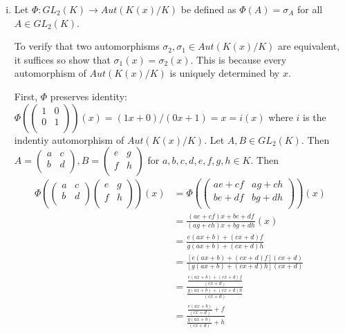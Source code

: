 \begin{solution}
\begin{enumerate}[(i)]
		\item Let $\Phi : GL_2(K) \longrightarrow Aut(K(x)/K) $ be defined as
		$\Phi (A) = \sigma_A $ for all $A \in GL_2(K)$. 
		\begin{remark}
			To verify that two automorphisms $\sigma_2,\sigma_1 \in Aut(K(x)/K)$ 
			are equivalent, it suffices so show that $\sigma_1(x)=\sigma_2(x)$. 
			This is because every automorphism of $Aut(K(x)/K)$ is uniquely 
			determined by $x$. 
		\end{remark}
			First, $\Phi$ preserves
			identity: $\Phi(\begin{pmatrix} 1 & 0 \\ 0 & 1 \\ \end{pmatrix})(x) = (1x + 0)/(0x +1) = x = i(x)$
			where $i$ is the indentiy automorphism of $Aut(K(x)/K)$. Let $A,B \in GL_2(K)$.
			Then $A = \begin{pmatrix} a & c \\ b & d \\ \end{pmatrix} , B = \begin{pmatrix} e & g \\ f & h \\ \end{pmatrix} $ 
			for $a,b,c,d,e,f,g,h \in K$. Then
			\begin{align*}
				\Phi (\begin{pmatrix} a & c \\ b & d \\ \end{pmatrix}
				\begin{pmatrix} e & g \\ f & h \\ \end{pmatrix})(x) &= 
				\Phi (\begin{pmatrix} ae + cf & ag + ch \\ be + df & bg + dh \\ \end{pmatrix})(x) \\
				&= \frac{(ae+cf)x + be+df}{(ag+ch)x+bg+dh} (x)\\
				&= \frac{e(ax+b) + (cx+d)f}{g(ax+b)+ (cx+d)h} \\
				&= \frac{[e(ax+b) + (cx+d)f](cx+d)}{[g(ax+b)+ (cx+d)h](cx+d)} \\
				&= \frac{\frac{e(ax+b) + (cx+d)f}{(cx+d)}}{\frac{g(ax+b) + (cx+d)h}{(cx+d)}} \\
				&= \frac{\frac{e(ax+b)}{(cx+d)}+f}{\frac{g(ax+b)}{(cx+d)}+h} \\

\end{align*}
\end{enumerate}
\end{solution}
